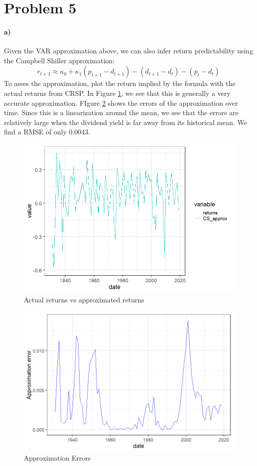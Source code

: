 \documentclass[11pt,letter]{article}
\begin{document}
\section*{Problem 5}
\paragraph{a)}Given the VAR approximation above, we can also infer return predictability using the Campbell Shiller approximation:
\begin{equation*}
	r_{t+1} \approx \kappa_0 + \kappa_1 (p_{t+1} - d_{t+1}) - (d_{t+1} - d_t) - (p_t - d_t)
\end{equation*}
To asses the approximation, plot the return implied by the formula with the actual returns from CRSP. In Figure \ref{fig:CS_approx}, we see that this is generally a very accurate approximation. FIgure \ref{fig:CS_error} shows the errors of the approximation over time. Since this is a linearization around the mean, we see that the errors are relatively large when the dividend yield is far away from its historical mean. We find a RMSE of only $0.0043$.

\begin{figure}[!htb]
	\centering
	\includegraphics[scale = 0.5]{CS_approx.png}
	\caption{Actual returns vs approximated returns}
	\label{fig:CS_approx}
\end{figure}
\begin{figure}[!htb]
	\centering
	\includegraphics[scale = 0.5]{CS_error.png}
	\caption{Approximation Errors}
	\label{fig:CS_error}
\end{figure}
\end{document}
